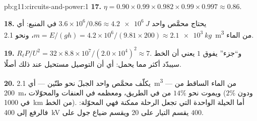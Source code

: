 \begin{solution}{pb:g11:circuits-and-power:1}
\textbf{17.} $\eta = 0.90 \times 0.99 \times 0.982 \times 0.99 \times
0.997 \approx 0.86$.

\textbf{18.} يحتاج  محمَّص واحد $3.6\times10^{6}/0.86
\approx \qty{4.2e6}{J}$ في المنبع: أي $m = E/(gh) = 4.2\times10^{6}/(9.81
\times 200) \approx \qty{2.1e3}{kg}$، ونحو \qty{2.1}{m^3} من الماء.

\textbf{19.} $R_\ell P/U^2 = 32 \times 8.8\times10^{7}/(2.0\times
10^{4})^2 \approx 7$. و``جزء'' يفوق $1$ يعني أن الخط سيبدّد
أكثر مما يحمل: أي أن التوصيل مستحيل عند ذلك
 أصلًا.

\textbf{20.} يكلّف  محمَّص واحد الجبلَ نحو طنّين
--- أي \qty{2.1}{m^3} --- من الماء الساقط من \qty{200}{m}، ويموت نحو
$14\%$ من  في الطريق، ومعظمه في العنفات والمحوّلات
(ودون $2\%$ في \qty{1000}{km} من الخط). أما الحيلة الواحدة التي تجعل
الرحلة ممكنة فهي المحوّلة: فالرفع إلى \qty{400}{kV}
يقسم التيار على $20$ ويقسم ضياع جول على $400$.
\end{solution}

